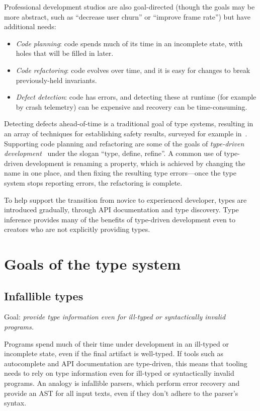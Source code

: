 \documentclass[acmsmall]{acmart}
\begin{document}
Professional development studios are also goal-directed (though the
goals may be more abstract, such as ``decrease user churn'' or
``improve frame rate'') but have additional needs:
\begin{itemize}

\item \emph{Code planning}:
  code spends much of its time in an incomplete state, with holes
  that will be filled in later.

\item \emph{Code refactoring}:
  code evolves over time, and it is easy for changes to
  break previously-held invariants.

\item \emph{Defect detection}:
  code has errors, and detecting these at runtime (for example by crash telemetry)
  can be expensive and recovery can be time-consuming.
  
\end{itemize}
Detecting defects ahead-of-time is a traditional goal of type systems,
resulting in an array of techniques for establishing safety results,
surveyed for example in~\cite{TAPL}. Supporting code planning and
refactoring are some of the goals of \emph{type-driven
development}~\cite{TDDIdris} under the slogan ``type, define,
refine''.  A common use of type-driven development is renaming a
property, which is achieved by changing the name in one place,
and then fixing the resulting type errors---once the type system stops
reporting errors, the refactoring is complete.

To help support the transition from novice to experienced developer,
types are introduced gradually, through API documentation and type discovery.
Type inference provides many of the benefits of type-driven development
even to creators who are not explicitly providing types.

\section{Goals of the type system}
\subsection{Infallible types}

Goal: \emph{provide type information even for ill-typed or syntactically invalid programs.}

Programs spend much of their time under development in an ill-typed or incomplete state, even if the
final artifact is well-typed. If tools such as autocomplete and API documentation are type-driven,
this means that tooling needs to rely on type information even for ill-typed
or syntactically invalid programs. An analogy is infallible parsers, which perform error recovery and
provide an AST for all input texts, even if they don't adhere to the parser's syntax.
\end{document}
